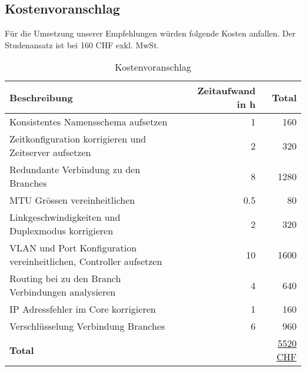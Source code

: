 \subsection{Kostenvoranschlag}
Für die Umsetzung unserer Empfehlungen würden folgende Kosten anfallen. Der Studenansatz ist bei 160 CHF exkl. MwSt.
\begin{table}[h]
	\centering
	\begin{tabu} to \linewidth {X[3] r r}
		\toprule 
		Beschreibung & Zeitaufwand in h & Total \\
		\midrule
		Konsistentes Namensschema aufsetzen & 1   &  160 \\
		Zeitkonfiguration korrigieren und Zeitserver aufsetzen & 2   & 320 \\
		Redundante Verbindung zu den Branches & 8   & 1280 \\
		MTU Grössen vereinheitlichen & 0.5   & 80 \\
		Linkgeschwindigkeiten und Duplexmodus korrigieren & 2   & 320\\
		VLAN und Port Konfiguration  vereinheitlichen, Controller aufsetzen & 10  & 1600 \\
		Routing bei zu den Branch Verbindungen analysieren & 4 & 640  \\
		IP Adressfehler im Core korrigieren & 1 & 160 \\
		Verschlüsselung Verbindung Branches & 6 & 960 \\
		\midrule
		\textbf{Total} & & \underline{\underline{5520 CHF}} \\
		\bottomrule 
	\end{tabu} 
	\caption{Kostenvoranschlag}
\end{table}


